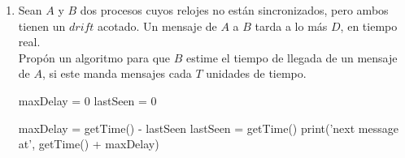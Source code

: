 \documentclass[12pt,a4paper]{report}
\begin{document}
\begin{enumerate}
	\item {
		Sean $A$ y $B$ dos procesos cuyos relojes no están sincronizados,
		pero ambos tienen un $drift$ acotado. Un mensaje de $A$ a $B$
		tarda a lo más $D$, en tiempo real.\\
		Propón un algoritmo para que $B$ estime el tiempo de llegada de un
		mensaje de $A$, si este manda mensajes cada $T$ unidades de tiempo.

		\begin{algorithmic}[1]
			\Initially
			 	\State maxDelay = 0
				\State lastSeen = 0
			\EndInitially
			\Statex

					\State maxDelay = getTime() - lastSeen
				\EndIf
				\State lastSeen = getTime()
				\State print('next message at', getTime() + maxDelay)
			\EndUpon
		\end{algorithmic}
	}
\end{enumerate}
\end{document}

